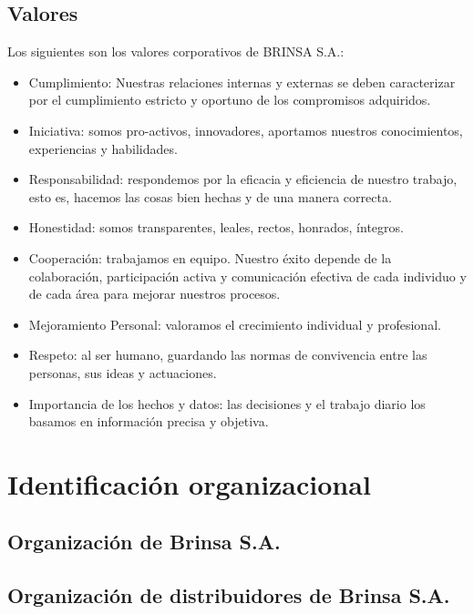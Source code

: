 \subsection{Valores}
Los siguientes son los valores corporativos de BRINSA S.A.:%
\begin{itemize}
	\item Cumplimiento: Nuestras relaciones internas y externas se deben caracterizar por el cumplimiento estricto y oportuno de los compromisos adquiridos.%
	\item Iniciativa: somos pro-activos, innovadores, aportamos nuestros conocimientos, experiencias y habilidades.%
	\item Responsabilidad: respondemos por la eficacia y eficiencia de nuestro trabajo, esto es, hacemos las cosas bien hechas y de una manera correcta.%
	\item Honestidad: somos transparentes, leales, rectos, honrados, \'integros.%
	\item Cooperaci\'on: trabajamos en equipo. Nuestro \'exito depende de la colaboraci\'on, participaci\'on activa y comunicaci\'on efectiva de cada individuo y de cada \'area para mejorar nuestros procesos.%
	\item Mejoramiento Personal: valoramos el crecimiento individual y profesional.%
	\item Respeto: al ser humano, guardando las normas de convivencia entre las personas, sus ideas y actuaciones.
	\item Importancia de los hechos y datos: las decisiones y el trabajo diario los basamos en informaci\'on precisa y objetiva.
\end{itemize}
%
\newpage%
\section{Identificaci\'on organizacional}
\subsection{Organizaci\'on de Brinsa S.A.}
\newpage
\subsection{Organizaci\'on de distribuidores de Brinsa S.A.}
%
